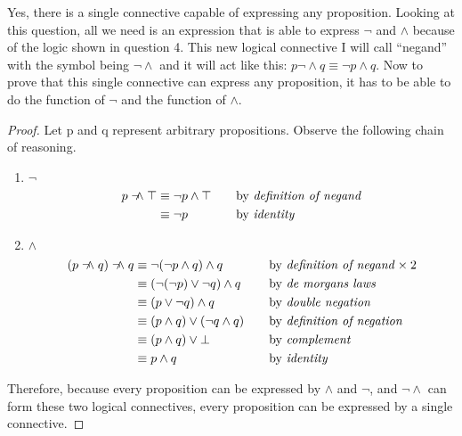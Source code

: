 \documentclass{article}
\newcommand{\negland}{\mathrel{\neg\!\!\land}}
\begin{document}
\begin {enumerate}
    Yes, there is a single connective capable of expressing any proposition. Looking at this question, all we need is an expression that is able to express $\neg$ and $\land$ because of the logic shown in question 4. This new logical connective I will call ``negand'' with the symbol being $\negland$ and it will act like this: $p \negland q \equiv \neg p \land q$. Now to prove that this single connective can express any proposition, it has to be able to do the function of $\neg$ and the function of $\land$.
\begin{proof}
    Let p and q  represent arbitrary propositions. Observe the following chain of reasoning.
    \begin{enumerate}
        \item $\neg$
            \begin{align*}
                p \negland \top
                    &\equiv \neg p \land \top
                        &\quad
                        &\text{by \emph{definition of negand}} 
                        \\
                    &\equiv \neg p
                        &\quad
                        &\text{by \emph{identity}}
                        \\
            \end{align*}
        \item $\land$
            \begin{align*}
                (p \negland q) \negland q
                    &\equiv \neg(\neg p \land q) \land q
                        &\quad
                        &\text{by \emph{definition of negand}}\times2
                        \\
                    &\equiv (\neg(\neg p) \lor \neg q) \land q
                        &\quad
                        &\text{by \emph{de morgans laws}} 
                        \\
                    &\equiv (p \lor \neg q) \land q
                        &\quad
                        &\text{by \emph{double negation}} 
                        \\
                    &\equiv (p \land q)\lor (\neg q \land q)
                        &\quad
                        &\text{by \emph{definition of negation}}
                        \\
                    &\equiv (p \land q)\lor \bot
                        &\quad
                        &\text{by \emph{complement}}
                        \\
                    &\equiv p \land q
                        &\quad
                        &\text{by \emph{identity}}
                        \\
            \end{align*}

    \end{enumerate}
    Therefore, because every proposition can be expressed by $\land$ and $\neg$, and $\negland$ can form these two logical connectives, every proposition can be expressed by a single connective.
\end{proof}

\end{enumerate}
\end{document}
